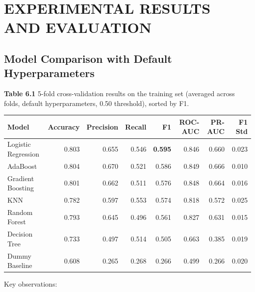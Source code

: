 
\section{ EXPERIMENTAL RESULTS AND EVALUATION}
\subsection{Model Comparison with Default Hyperparameters}

\noindent\textbf{Table 6.1} 5-fold cross-validation results on the training set (averaged across folds, default hyperparameters, 0.50 threshold), sorted by F1.

\begin{center}
\small
\begin{tabular}{l r r r r r r r}
\toprule
\textbf{Model} & \textbf{Accuracy} & \textbf{Precision} & \textbf{Recall} & \textbf{F1} & \textbf{ROC-AUC} & \textbf{PR-AUC} & \textbf{F1 Std} \\
\midrule
Logistic Regression & 0.803 & 0.655 & 0.546 & \textbf{0.595} & 0.846 & 0.660 & 0.023 \\
AdaBoost & 0.804 & 0.670 & 0.521 & 0.586 & 0.849 & 0.666 & 0.010 \\
Gradient Boosting & 0.801 & 0.662 & 0.511 & 0.576 & 0.848 & 0.664 & 0.016 \\
KNN & 0.782 & 0.597 & 0.553 & 0.574 & 0.818 & 0.572 & 0.025 \\
Random Forest & 0.793 & 0.645 & 0.496 & 0.561 & 0.827 & 0.631 & 0.015 \\
Decision Tree & 0.733 & 0.497 & 0.514 & 0.505 & 0.663 & 0.385 & 0.019 \\
Dummy Baseline & 0.608 & 0.265 & 0.268 & 0.266 & 0.499 & 0.266 & 0.020 \\
\bottomrule
\end{tabular}
\end{center}

Key observations:

